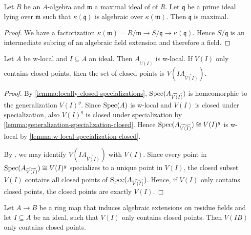 \begin{lemma}[\stacksproject{00GA}]
    Let $B$ be an $A$-algebra and $\mathfrak{m}$ a maximal ideal of of $R$. Let
    $\mathfrak{q}$ be a prime ideal lying over $\mathfrak{m}$ such that
    $\kappa(\mathfrak{q})$ is algebraic over $\kappa(\mathfrak{m})$. Then
    $\mathfrak{q}$ is maximal.
    \label{lemma:prime-over-maximal-algebraic}
\end{lemma}

\begin{proof}
    We have a factorization $\kappa(\mathfrak{m}) = R / \mathfrak{m} \to S / \mathfrak{q} \to \kappa(\mathfrak{q})$.
    Hence $S / \mathfrak{q}$ is an intermediate subring of an algebraic field extension and therefore
    a field.
\end{proof}

\begin{lemma}
    Let $A$ be w-local and $I \subseteq A$ an ideal. Then
    $A_{\widetilde{V(I)}}$ is w-local. If $V(I)$ only contains closed points, then
    the set of closed points is $V(IA_{\widetilde{V(I)}})$.
    \label{lemma:w-local-tilde-w-local}
\end{lemma}

\begin{proof}
    By \ref{lemma:locally-closed-specializations}, $\mathrm{Spec}(A_{\widetilde{V(I)}})$ is homeomorphic
    to the generalization $V(I)^g$. Since $\mathrm{Spec}(A)$ is w-local and $V(I)$ is closed
    under specialization, also $V(I)^g$ is closed under specialization by
    \ref{lemma:generalization-specialization-closed}. Hence
    $\mathrm{Spec}(A_{\widetilde{V(I)}}) \cong V(I)^g$ is w-local by \ref{lemma:w-local-specialization-closed}.

    By , we may identify $V(IA_{\widetilde{V(I)}})$ with
    $V(I)$.
    Since every point in
    $\mathrm{Spec}(A_{\widetilde{V(I)}}) \cong V(I)^g$ specializes to a unique point in $V(I)$,
    the closed subset $V(I)$ contains all closed points of $\mathrm{Spec}(A_{\widetilde{V(I)}})$. Hence,
    if $V(I)$ only contains closed points, the closed points are exactly $V(I)$.
\end{proof}

\begin{lemma}
    Let $A \to B$ be a ring map that induces algebraic extensions on residue fields
    and let $I \subseteq A$ be an ideal, such that $V(I)$ only contains closed points.
    Then $V(IB)$ only contains closed points.
    \label{lemma:preimage-closed-points-algebraic}
\end{lemma}

